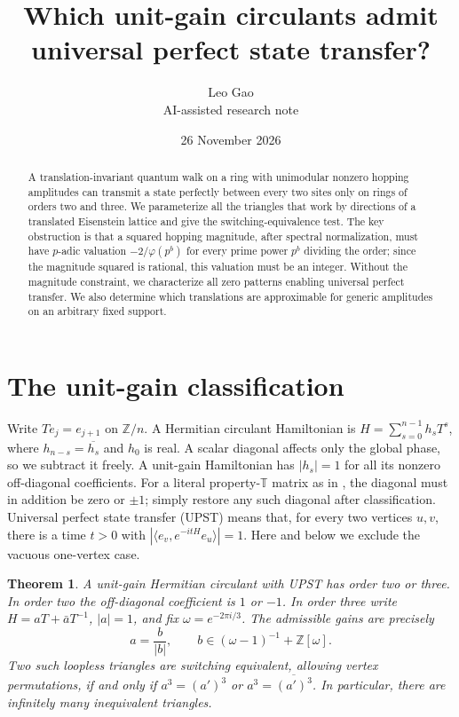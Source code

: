 \documentclass[10pt]{article}
\title{Which unit-gain circulants admit universal perfect state transfer?}
\author{Leo Gao\\\small AI-assisted research note}
\date{26 November 2026}
\newtheorem{theorem}{Theorem}
\newcommand{\ZZ}{\mathbb Z}\newcommand{\QQ}{\mathbb Q}
\begin{document}
\maketitle
\begin{abstract}
A translation-invariant quantum walk on a ring with unimodular nonzero
hopping amplitudes can transmit a state perfectly between every two sites
only on rings of orders two and three. We parameterize all the triangles
that work by directions of a translated Eisenstein lattice and give the switching-equivalence test.
The key obstruction is that a squared hopping magnitude, after spectral
normalization, must have $p$-adic valuation $-2/\varphi(p^b)$
for every prime power $p^b$ dividing the order; since the magnitude squared is rational,
this valuation must be an integer.
Without the magnitude constraint, we characterize all zero patterns
enabling universal perfect transfer. We also determine which translations
are approximable for generic amplitudes on an arbitrary fixed support.
\end{abstract}

\section{The unit-gain classification}
Write $T e_j=e_{j+1}$ on $\ZZ/n$. A Hermitian circulant Hamiltonian is
$H=\sum_{s=0}^{n-1} h_s T^s$, where $h_{n-s}=\overline{h_s}$ and $h_0$ is real.
A scalar diagonal affects only the global phase, so we subtract it freely. A unit-gain Hamiltonian has $|h_s|=1$ for all its nonzero off-diagonal coefficients.
For a literal property-$\mathbb T$ matrix as in \cite{connelly}, the diagonal must in addition be zero or $\pm1$; simply restore any such diagonal after classification.
Universal perfect state transfer (UPST) means that, for every two vertices
$u,v$, there is a time $t>0$ with $|\langle e_v,e^{-itH}e_u\rangle|=1$.
Here and below we exclude the vacuous one-vertex case.

\begin{theorem}\label{th:main}
A unit-gain Hermitian circulant with UPST has order two or three. In order two the
off-diagonal coefficient is $1$ or $-1$. In order three write
$H=aT+\bar a T^{-1}$, $|a|=1$, and fix $\omega=e^{-2\pi i/3}$. The admissible gains are precisely
\[
 a=\frac{b}{|b|},\qquad b\in (\omega-1)^{-1}+\ZZ[\omega].
\]
Two such loopless triangles are switching equivalent, allowing vertex
permutations, if and only if $a^3=(a')^3$ or $a^3=\overline{(a')^3}$.
In particular, there are infinitely many inequivalent triangles.
\end{theorem}
\end{document}
